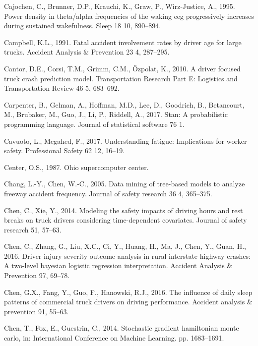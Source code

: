 \documentclass[12pt]{book}
\numberwithin{equation}{chapter}
\begin{document}
\leavevmode\hypertarget{ref-cajochen1995power}{}%
Cajochen, C., Brunner, D.P., Krauchi, K., Graw, P., Wirz-Justice, A., 1995. Power density in theta/alpha frequencies of the waking eeg progressively increases during sustained wakefulness. Sleep 18 10, 890--894.

\leavevmode\hypertarget{ref-campbell1991fatal}{}%
Campbell, K.L., 1991. Fatal accident involvement rates by driver age for large trucks. Accident Analysis \& Prevention 23 4, 287--295.

\leavevmode\hypertarget{ref-cantor2010driver}{}%
Cantor, D.E., Corsi, T.M., Grimm, C.M., Özpolat, K., 2010. A driver focused truck crash prediction model. Transportation Research Part E: Logistics and Transportation Review 46 5, 683--692.

\leavevmode\hypertarget{ref-carpenter2017stan}{}%
Carpenter, B., Gelman, A., Hoffman, M.D., Lee, D., Goodrich, B., Betancourt, M., Brubaker, M., Guo, J., Li, P., Riddell, A., 2017. Stan: A probabilistic programming language. Journal of statistical software 76 1.

\leavevmode\hypertarget{ref-cavuoto2017understanding}{}%
Cavuoto, L., Megahed, F., 2017. Understanding fatigue: Implications for worker safety. Professional Safety 62 12, 16--19.

\leavevmode\hypertarget{ref-OSC1987}{}%
Center, O.S., 1987. Ohio supercomputer center.

\leavevmode\hypertarget{ref-chang2005data}{}%
Chang, L.-Y., Chen, W.-C., 2005. Data mining of tree-based models to analyze freeway accident frequency. Journal of safety research 36 4, 365--375.

\leavevmode\hypertarget{ref-chen2014modeling}{}%
Chen, C., Xie, Y., 2014. Modeling the safety impacts of driving hours and rest breaks on truck drivers considering time-dependent covariates. Journal of safety research 51, 57--63.

\leavevmode\hypertarget{ref-chen2016driver}{}%
Chen, C., Zhang, G., Liu, X.C., Ci, Y., Huang, H., Ma, J., Chen, Y., Guan, H., 2016. Driver injury severity outcome analysis in rural interstate highway crashes: A two-level bayesian logistic regression interpretation. Accident Analysis \& Prevention 97, 69--78.

\leavevmode\hypertarget{ref-chen2016influence}{}%
Chen, G.X., Fang, Y., Guo, F., Hanowski, R.J., 2016. The influence of daily sleep patterns of commercial truck drivers on driving performance. Accident analysis \& prevention 91, 55--63.

\leavevmode\hypertarget{ref-chen2014stochastic}{}%
Chen, T., Fox, E., Guestrin, C., 2014. Stochastic gradient hamiltonian monte carlo, in: International Conference on Machine Learning. pp. 1683--1691.
\end{document}
